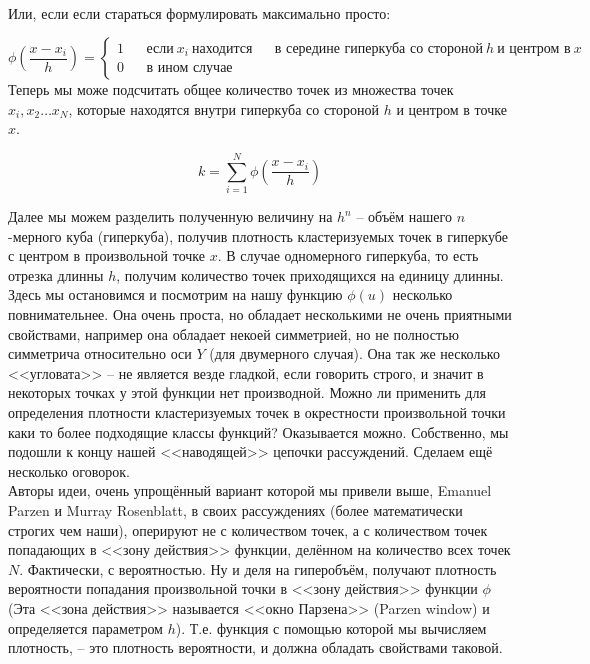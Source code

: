 \documentclass[11pt]{article}
\begin{document}
    \begin{center}
    \end{center}
    { \hspace*{\fill} \\}
   
    Или, если если стараться формулировать максимально просто:

$$ 
\phi\left(\frac{x - x_i}{h}\right) = \left\lbrace
            \begin{aligned}
            1 && \mbox{если} \: x_i \: \mbox{находится} && \mbox{в середине гиперкуба со стороной}\: h \: \mbox{и центром в} \: x \\
            0 && \mbox{в ином случае} &&
           \end{aligned}
          \right.
$$
Теперь мы може подсчитать общее количество точек из множества точек
$x_i, x_2 \ldots x_N$, которые находятся внутри гиперкуба со стороной
$h$ и центром в точке $x$.

$$
k = \sum\limits_{i = 1}^{N}\phi\left(\frac{x - x_i}{h}\right)
$$

 Далее мы можем разделить полученную величину на $h^n$ -- объём
нашего $n$-мерного куба (гиперкуба), получив плотность кластеризуемых
точек в гиперкубе с центром в произвольной точке $x$. В случае
одномерного гиперкуба, то есть отрезка длинны $h$, получим количество
точек приходящихся на единицу длинны. \\ Здесь мы
остановимся и посмотрим на нашу функцию $\phi(u)$ несколько
повнимательнее. Она очень проста, но обладает несколькими не очень
приятными свойствами, например она обладает некоей симметрией, но не
полностью симметрича относительно оси $Y$ (для двумерного случая). Она
так же несколько <<угловата>> -- не является везде гладкой, если
говорить строго, и значит в некоторых точках у этой функции нет
производной. Можно ли применить для определения плотности кластеризуемых
точек в окрестности произвольной точки каки то более подходящие классы
функций? Оказывается можно. Собственно, мы подошли к концу нашей
<<наводящей>> цепочки рассуждений. Сделаем ещё несколько оговорок.
\\  Авторы идеи, очень упрощённый вариант которой мы
привели выше, Emanuel Parzen и Murray Rosenblatt, в своих рассуждениях
(более математически строгих чем наши), оперируют не с количеством
точек, а с количеством точек попадающих в <<зону действия>>
функции, делённом на количество всех точек $N$. Фактически, с
вероятностью. Ну и деля на гиперобъём, получают плотность вероятности
попадания произвольной точки в <<зону действия>> функции $\phi$
(Эта <<зона действия>> называется <<окно Парзена>> (Parzen
window) \cite{litlink0} и определяется параметром $h$). Т.е. функция с
помощью которой мы вычисляем плотность, -- это плотность вероятности,
и должна обладать свойствами таковой.
\end{document}
